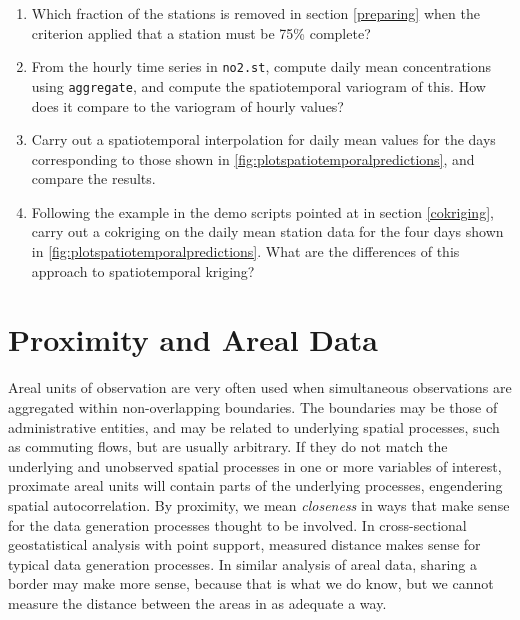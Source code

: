 \documentclass[]{book}
\providecommand{\tightlist}{%
  \setlength{\itemsep}{0pt}\setlength{\parskip}{0pt}}
\begin{document}
\begin{enumerate}
\def\labelenumi{\arabic{enumi}.}
\tightlist
\item
  Which fraction of the stations is removed in section \ref{preparing} when
  the criterion applied that a station must be 75\% complete?
\item
  From the hourly time series in \texttt{no2.st}, compute daily mean concentrations
  using \texttt{aggregate}, and compute the spatiotemporal variogram of this. How does
  it compare to the variogram of hourly values?
\item
  Carry out a spatiotemporal interpolation for daily mean values for the days
  corresponding to those shown in \ref{fig:plotspatiotemporalpredictions}, and
  compare the results.
\item
  Following the example in the demo scripts pointed
  at in section \ref{cokriging}, carry out a cokriging
  on the daily mean station data for the four days shown in
  \ref{fig:plotspatiotemporalpredictions}. What are the differences
  of this approach to spatiotemporal kriging?
\end{enumerate}

\hypertarget{area}{%
\chapter{Proximity and Areal Data}\label{area}}

Areal units of observation are very often used when simultaneous observations are aggregated within non-overlapping boundaries. The boundaries may be those of administrative entities, and may be related to underlying spatial processes, such as commuting flows, but are usually arbitrary. If they do not match the underlying and unobserved spatial processes in one or more variables of interest, proximate areal units will contain parts of the underlying processes, engendering spatial autocorrelation. By proximity, we mean \emph{closeness} in ways that make sense for the data generation processes thought to be involved. In cross-sectional geostatistical analysis with point support, measured distance makes sense for typical data generation processes. In similar analysis of areal data, sharing a border may make more sense, because that is what we do know, but we cannot measure the distance between the areas in as adequate a way.
\end{document}
